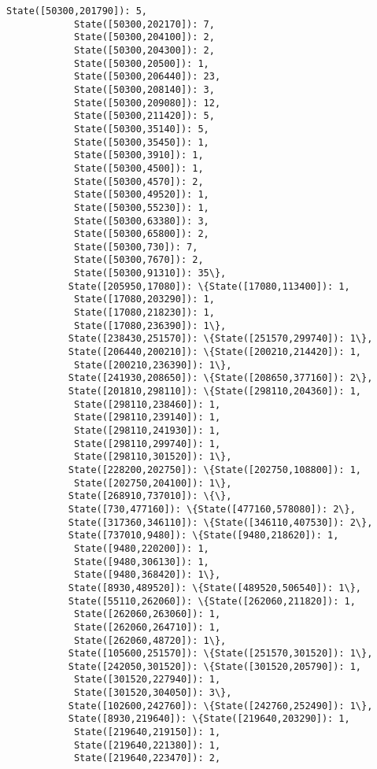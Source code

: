 \documentclass[11pt]{article}
\begin{document}
\begin{Verbatim}[commandchars=\\\{\}]
            State([50300,201790]): 5,
            State([50300,202170]): 7,
            State([50300,204100]): 2,
            State([50300,204300]): 2,
            State([50300,20500]): 1,
            State([50300,206440]): 23,
            State([50300,208140]): 3,
            State([50300,209080]): 12,
            State([50300,211420]): 5,
            State([50300,35140]): 5,
            State([50300,35450]): 1,
            State([50300,3910]): 1,
            State([50300,4500]): 1,
            State([50300,4570]): 2,
            State([50300,49520]): 1,
            State([50300,55230]): 1,
            State([50300,63380]): 3,
            State([50300,65800]): 2,
            State([50300,730]): 7,
            State([50300,7670]): 2,
            State([50300,91310]): 35\},
           State([205950,17080]): \{State([17080,113400]): 1,
            State([17080,203290]): 1,
            State([17080,218230]): 1,
            State([17080,236390]): 1\},
           State([238430,251570]): \{State([251570,299740]): 1\},
           State([206440,200210]): \{State([200210,214420]): 1,
            State([200210,236390]): 1\},
           State([241930,208650]): \{State([208650,377160]): 2\},
           State([201810,298110]): \{State([298110,204360]): 1,
            State([298110,238460]): 1,
            State([298110,239140]): 1,
            State([298110,241930]): 1,
            State([298110,299740]): 1,
            State([298110,301520]): 1\},
           State([228200,202750]): \{State([202750,108800]): 1,
            State([202750,204100]): 1\},
           State([268910,737010]): \{\},
           State([730,477160]): \{State([477160,578080]): 2\},
           State([317360,346110]): \{State([346110,407530]): 2\},
           State([737010,9480]): \{State([9480,218620]): 1,
            State([9480,220200]): 1,
            State([9480,306130]): 1,
            State([9480,368420]): 1\},
           State([8930,489520]): \{State([489520,506540]): 1\},
           State([55110,262060]): \{State([262060,211820]): 1,
            State([262060,263060]): 1,
            State([262060,264710]): 1,
            State([262060,48720]): 1\},
           State([105600,251570]): \{State([251570,301520]): 1\},
           State([242050,301520]): \{State([301520,205790]): 1,
            State([301520,227940]): 1,
            State([301520,304050]): 3\},
           State([102600,242760]): \{State([242760,252490]): 1\},
           State([8930,219640]): \{State([219640,203290]): 1,
            State([219640,219150]): 1,
            State([219640,221380]): 1,
            State([219640,223470]): 2,

\end{Verbatim}
\end{document}
